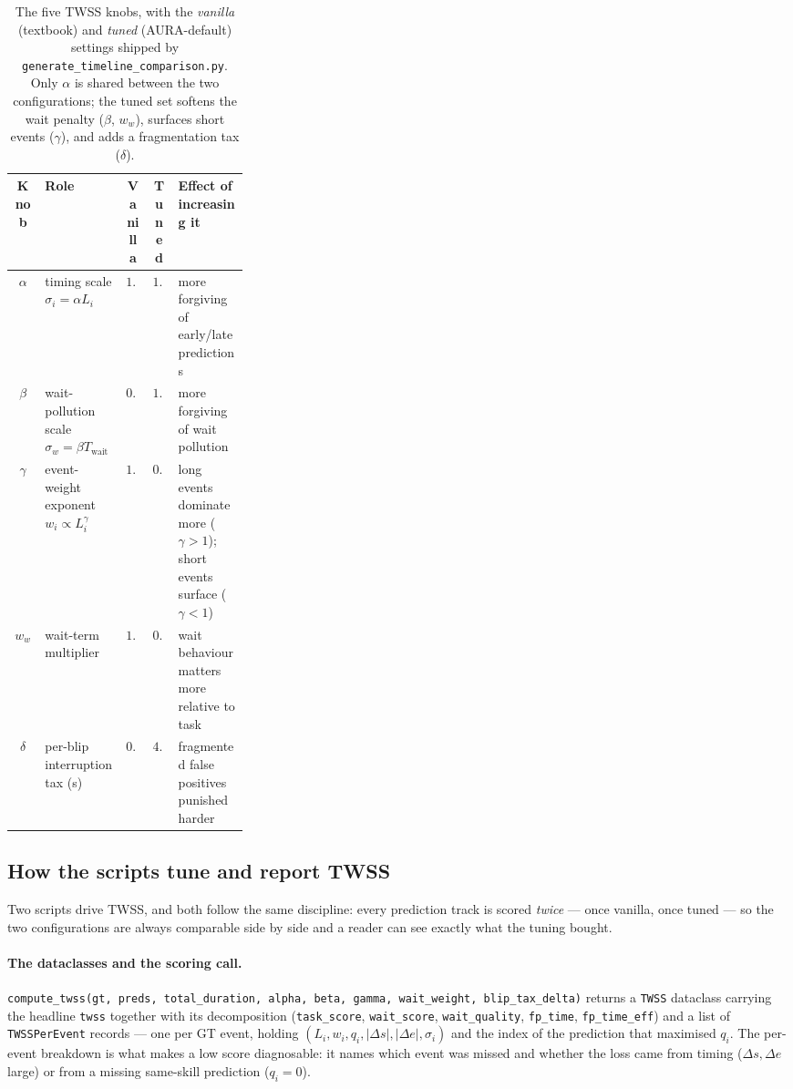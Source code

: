 \documentclass[11pt]{article}
\newcommand{\Twait}{T_{\text{wait}}}
\newcommand{\qi}{q_i}
\begin{document}
\begin{table}[ht]
\centering
\small
\begin{tabular}{clccp{0.30\linewidth}}
\toprule
\textbf{Knob} & \textbf{Role} & \textbf{Vanilla} & \textbf{Tuned} & \textbf{Effect of increasing it} \\
\midrule
$\alpha$ & timing scale $\sigma_i = \alpha L_i$        & $1.0$ & $1.0$ & more forgiving of early/late predictions \\
$\beta$  & wait-pollution scale $\sigma_w = \beta\Twait$ & $0.5$ & $1.5$ & more forgiving of wait pollution \\
$\gamma$ & event-weight exponent $w_i \propto L_i^\gamma$ & $1.0$ & $0.5$ & long events dominate more ($\gamma\!>\!1$); short events surface ($\gamma\!<\!1$) \\
$w_w$    & wait-term multiplier                          & $1.0$ & $0.6$ & wait behaviour matters more relative to task \\
$\delta$ & per-blip interruption tax (s)                 & $0.0$ & $4.0$ & fragmented false positives punished harder \\
\bottomrule
\end{tabular}
\caption{The five TWSS knobs, with the \emph{vanilla} (textbook) and
\emph{tuned} (AURA-default) settings shipped by
\texttt{generate\_timeline\_comparison.py}. Only $\alpha$ is shared
between the two configurations; the tuned set softens the wait
penalty ($\beta$, $w_w$), surfaces short events ($\gamma$), and adds a
fragmentation tax ($\delta$).}
\label{tab:knobs}
\end{table}

\subsection{How the scripts tune and report TWSS}
\label{sec:tuning-impl}

Two scripts drive TWSS, and both follow the same discipline: every
prediction track is scored \emph{twice} --- once vanilla, once tuned
--- so the two configurations are always comparable side by side and a
reader can see exactly what the tuning bought.

\paragraph{The dataclasses and the scoring call.}
\texttt{compute\_twss(gt, preds, total\_duration, alpha, beta, gamma,
wait\_weight, blip\_tax\_delta)} returns a \texttt{TWSS} dataclass
carrying the headline \texttt{twss} together with its decomposition
(\texttt{task\_score}, \texttt{wait\_score}, \texttt{wait\_quality},
\texttt{fp\_time}, \texttt{fp\_time\_eff}) and a list of
\texttt{TWSSPerEvent} records --- one per GT event, holding
$(L_i, w_i, \qi, |\Delta s|, |\Delta e|, \sigma_i)$ and the index of
the prediction that maximised $\qi$. The per-event breakdown is what
makes a low score diagnosable: it names which event was missed and
whether the loss came from timing ($\Delta s, \Delta e$ large) or from
a missing same-skill prediction ($\qi = 0$).
\end{document}

